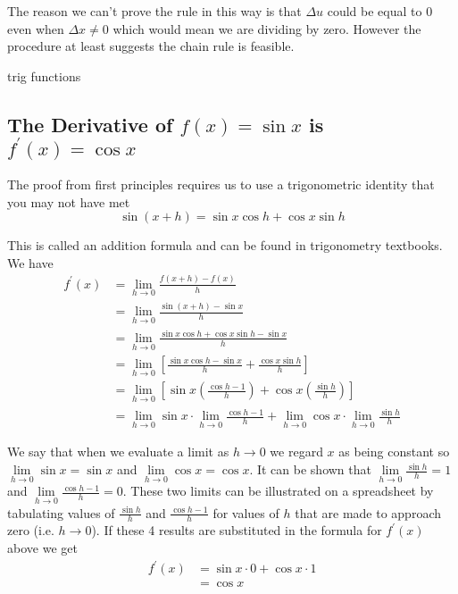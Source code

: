 The reason we can't prove the rule in this way is that $ \Delta u$ could be equal to $0$ even when $ \Delta x \neq 0$ which would mean we are dividing by zero. However the procedure at least suggests
the chain rule is feasible. 


trig functions
\subsection{The Derivative of $f (x) =\sin  x$ is $f^{ \prime } (x) =\cos  x$}
The proof from first principles requires us to use a trigonometric identity that you may not have met
\begin{equation*}\sin  (x +h) =\sin  x \cos  \text{}h +\cos  x \sin  \text{}h
\end{equation*}

This is called an addition formula and can be found in trigonometry textbooks. We
have
\begin{align*}f^{ \prime } (x) &  = \underset{h \rightarrow 0}{\lim }\frac{f (x +h) -f (x)}{h} \\
&  = \underset{h \rightarrow 0}{\lim }\frac{\sin  (x +h) -\sin  x}{h} \\
&  = \underset{h \rightarrow 0}{\lim }\frac{\sin  x \cos  \text{}h +\cos  x \sin  \text{}h -\sin  x}{h} \\
&  = \underset{h \rightarrow 0}{\lim }\left [\frac{\sin  x \cos  \text{}h -\sin  x}{h} +\frac{\cos  x \sin  \text{}h}{h}\right ] \\
&  = \underset{h \rightarrow 0}{\lim }\left [\sin  x \genfrac{(}{)}{}{}{\cos  \text{}h -1}{h} +\cos  x \genfrac{(}{)}{}{}{\sin  \text{}h}{h}\right ] \\
&  = \underset{h \rightarrow 0}{\lim }\sin  x \cdot \underset{h \rightarrow 0}{\lim } \frac{\cos  \text{}h -1}{h} +\underset{h \rightarrow 0}{\lim }\cos  x \cdot \underset{h \rightarrow 0}{\lim } \frac{\sin  \text{}h}{h}\end{align*}

We say that when we evaluate a limit as $h \rightarrow 0$ we regard $x$ as being constant so $\underset{h \rightarrow 0}{\lim }\sin  x =\sin  x$ and $\underset{h \rightarrow 0}{\lim }\cos  x =\cos  x$. It can be shown that $\underset{h \rightarrow 0}{\lim }\frac{\sin  \text{}h}{h} =1$ and $\underset{h \rightarrow 0}{\lim }\frac{\cos  \text{}h -1}{h} =0$. These two limits can be illustrated on a spreadsheet by tabulating values of $\frac{\sin  \text{}h}{h}$ and $\frac{\cos  \text{}h -1}{h}$ for values of $h$ that are made to approach zero (i.e. $h \rightarrow 0$). If these 4 results are substituted in the formula for $f^{ \prime } (x)$ above we get
\begin{align*}f^{ \prime } (x) &  = \sin  x \cdot 0 +\cos  x \cdot 1 \\
&  = \cos  x\end{align*}

